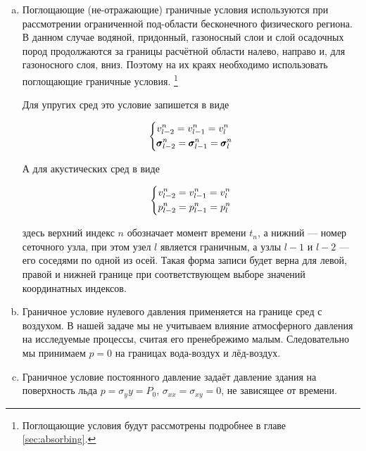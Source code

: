 \begin{enumerate}[a.]
    \item Поглощающие (не-отражающие) граничные условия используются при рассмотрении ограниченной под-области бесконечного физического региона. В данном случае водяной, придонный, газоносный слои и слой осадочных пород продолжаются за границы расчётной области налево, направо и, для газоносного слоя, вниз. Поэтому на их краях необходимо использовать поглощающие граничные условия. \footnote{Поглощающие условия будут рассмотрены подробнее в главе \ref{sec:absorbing}.}
    
    Для упругих сред это условие запишется в виде
    
    \begin{equation}
    \begin{dcases}
        v_{l-2}^n = 
        v_{l-1}^n = 
        v_{l}^n \\
        \pmb{\sigma}_{l-2}^n = 
        \pmb{\sigma}_{l-1}^n = 
        \pmb{\sigma}_{l}^n
    \end{dcases}
    \end{equation}
    
    А для акустических сред в виде
    
    \begin{equation}
    \begin{dcases}
        v_{l-2}^n = 
        v_{l-1}^n = 
        v_{l}^n \\
        p_{l-2}^n = 
        p_{l-1}^n = 
        p_{l}^n
    \end{dcases}
    \end{equation}
    
    здесь верхний индекс $n$ обозначает момент времени $t_n$, а нижний --- номер сеточного узла, при этом узел $l$ является граничным, а узлы $l-1$ и $l-2$ --- его соседями по одной из осей. Такая форма записи будет верна для левой, правой и нижней границе при соответствующем выборе значений координатных индексов.
    
    \item Граничное условие нулевого давления применяется на границе сред с воздухом. В нашей задаче мы не учитываем влияние атмосферного давления на исследуемые процессы, считая его пренебрежимо малым. Следовательно мы принимаем $p=0$ на границах вода-воздух и лёд-воздух.
    
    \item Граничное условие постоянного давление задаёт давление здания на поверхность льда  $p = \sigma_yy = P_0$, $\sigma_{xx} = \sigma_{xy} = 0$, не зависящее от времени.
\end{enumerate}

